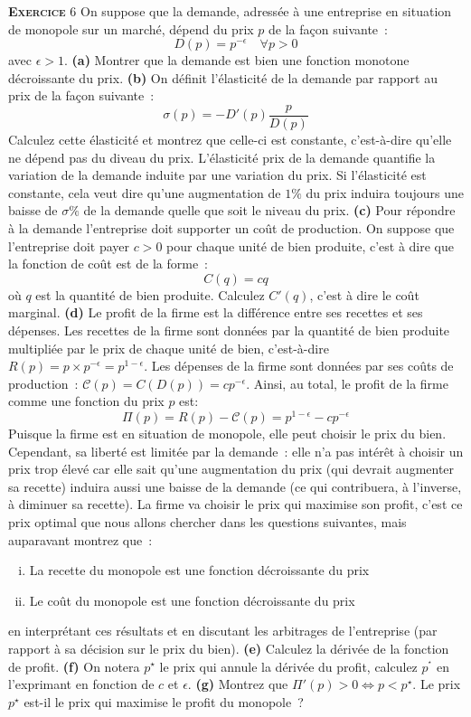\documentclass[10pt,a4paper,notitlepage,twocolumn]{article}
\newcommand{\exercice}[1]{\textsc{\textbf{Exercice}} #1}
\begin{document}
\bigskip

\exercice{6} On suppose que la demande, adressée à une entreprise en situation
de monopole sur un marché, dépend du prix $p$ de la façon suivante~:
\[
D(p) = p^{-\epsilon}\quad\forall p>0
\]
avec $\epsilon>1$. \textbf{(a)} Montrer que la demande est bien une fonction
monotone décroissante du prix. \textbf{(b)} On définit l'élasticité de la
demande par rapport au prix de la façon suivante :
\[
\sigma(p) = -D'(p)\frac{p}{D(p)}
\]
Calculez cette élasticité et montrez que celle-ci est constante, c'est-à-dire
qu'elle ne dépend pas du diveau du prix. L'élasticité prix de la demande
quantifie la variation de la demande induite par une variation du prix. Si
l'élasticité est constante, cela veut dire qu'une augmentation de $1\%$ du prix
induira toujours une baisse de $\sigma\%$ de la demande quelle que soit le
niveau du prix. \textbf{(c)} Pour répondre à la demande l'entreprise doit
supporter un coût de production. On suppose que l'entreprise doit payer $c>0$
pour chaque unité de bien produite, c'est à dire que la fonction de coût est de
la forme~:
\[
C(q) = cq
\]
où $q$ est la quantité de bien produite. Calculez $C'(q)$, c'est à dire le coût
marginal. \textbf{(d)} Le profit de la firme est la différence entre ses
recettes et ses dépenses. Les recettes de la firme sont données par la quantité
de bien produite multipliée par le prix de chaque unité de bien, c'est-à-dire
$R(p) = p\times p^{-\epsilon} = p^{1-\epsilon}$. Les dépenses de la firme sont
données par ses coûts de production :
$\mathcal C(p) = C(D(p)) = c p^{-\epsilon}$. Ainsi, au total, le profit de la
firme comme une fonction du prix $p$ est:
\[
\Pi(p) = R(p)-\mathcal C(p) = p^{1-\epsilon} - c p^{-\epsilon} 
\]
Puisque la firme est en situation de monopole, elle peut choisir le prix du
bien. Cependant, sa liberté est limitée par la demande~: elle n'a pas intérêt à
choisir un prix trop élevé car elle sait qu'une augmentation du prix (qui
devrait augmenter sa recette) induira aussi une baisse de la demande (ce qui
contribuera, à l'inverse, à diminuer sa recette). La firme va choisir le prix
qui maximise son profit, c'est ce prix optimal que nous allons chercher dans les
questions suivantes, mais auparavant montrez que~:
\begin{enumerate}[(i)]
\item La recette du monopole est une fonction décroissante du prix
\item Le coût du monopole est une fonction décroissante du prix
\end{enumerate}
en interprétant ces résultats et en discutant les arbitrages de l'entreprise (par
rapport à sa décision sur le prix du bien). \textbf{(e)} Calculez la dérivée de la fonction de
profit. \textbf{(f)} On notera $p^{\star}$ le prix qui annule la dérivée du
profit, calculez $p^{^\star}$ en l'exprimant en fonction de $c$ et $
\epsilon$.
\textbf{(g)} Montrez que $\Pi'(p)>0 \Leftrightarrow p<p^{\star}$. Le prix $p^{\star}$
est-il le prix qui maximise le profit du monopole~?
\end{document}
